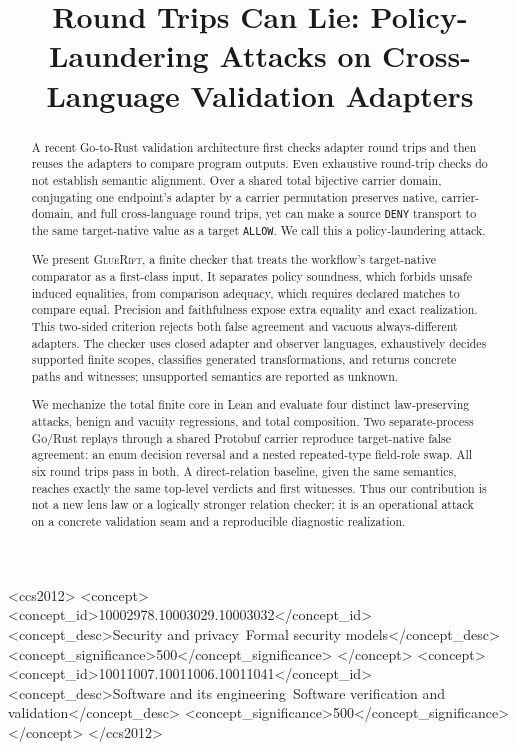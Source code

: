 \documentclass[sigconf,anonymous,review]{acmart}
\title{Round Trips Can Lie: Policy-Laundering Attacks on Cross-Language Validation Adapters}
\newcommand{\sys}{\textsc{GlueRift}\xspace}
\begin{document}
\begin{abstract}
A recent Go-to-Rust validation architecture first checks adapter
round trips and then reuses the adapters to compare program outputs.
Even exhaustive round-trip checks do not establish semantic alignment.
Over a shared total bijective carrier domain, conjugating one endpoint's
adapter by a carrier permutation preserves native, carrier-domain, and full
cross-language round trips, yet can make a
source \texttt{DENY} transport to the same target-native value as a
target \texttt{ALLOW}.  We call this a policy-laundering attack.

We present \sys, a finite checker that treats the workflow's
target-native comparator as a first-class input.  It separates policy soundness,
which forbids unsafe induced equalities, from comparison adequacy,
which requires declared matches to compare equal.  Precision and
faithfulness expose extra equality and exact realization.  This
two-sided criterion rejects both false agreement and vacuous
always-different adapters.  The checker uses closed adapter and
observer languages, exhaustively decides supported finite scopes,
classifies generated transformations, and returns concrete paths and
witnesses; unsupported semantics are reported as unknown.

We mechanize the total finite core in Lean and evaluate four distinct
law-preserving attacks, benign and vacuity regressions, and total
composition.  Two separate-process Go/Rust replays through a shared
Protobuf carrier reproduce target-native false agreement: an enum
decision reversal and a nested repeated-type field-role swap.  All six
round trips pass in both.  A direct-relation baseline, given the same
semantics, reaches exactly the same top-level verdicts and first
witnesses.  Thus our contribution is not a new lens law or a logically
stronger relation checker; it is an operational attack on a concrete
validation seam and a reproducible diagnostic realization.
\end{abstract}

\begin{CCSXML}
<ccs2012>
 <concept>
  <concept_id>10002978.10003029.10003032</concept_id>
  <concept_desc>Security and privacy~Formal security models</concept_desc>
  <concept_significance>500</concept_significance>
 </concept>
 <concept>
  <concept_id>10011007.10011006.10011041</concept_id>
  <concept_desc>Software and its engineering~Software verification and validation</concept_desc>
  <concept_significance>500</concept_significance>
 </concept>
</ccs2012>
\end{CCSXML}
\end{document}
